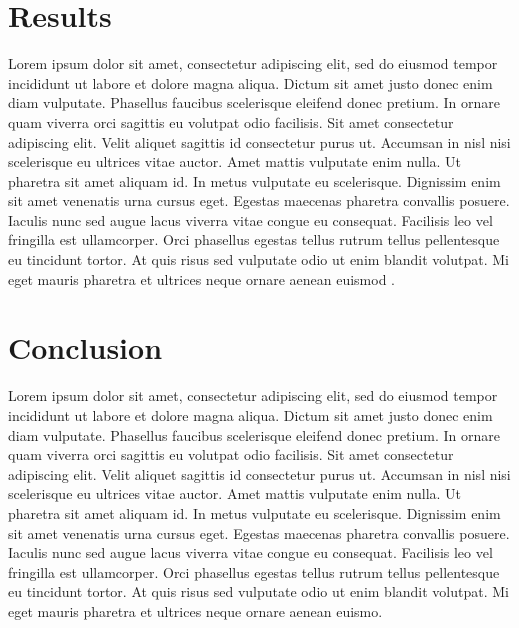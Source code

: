 \documentclass[letterpaper,10pt]{article}
\begin{document}
\section{Results}
Lorem ipsum dolor sit amet, consectetur adipiscing elit, sed do eiusmod tempor incididunt ut labore et dolore magna aliqua. Dictum sit amet justo donec enim diam vulputate. Phasellus faucibus scelerisque eleifend donec pretium. In ornare quam viverra orci sagittis eu volutpat odio facilisis. Sit amet consectetur adipiscing elit. Velit aliquet sagittis id consectetur purus ut. Accumsan in nisl nisi scelerisque eu ultrices vitae auctor. Amet mattis vulputate enim nulla. Ut pharetra sit amet aliquam id. In metus vulputate eu scelerisque. Dignissim enim sit amet venenatis urna cursus eget. Egestas maecenas pharetra convallis posuere. Iaculis nunc sed augue lacus viverra vitae congue eu consequat. Facilisis leo vel fringilla est ullamcorper. Orci phasellus egestas tellus rutrum tellus pellentesque eu tincidunt tortor. At quis risus sed vulputate odio ut enim blandit volutpat. Mi eget mauris pharetra et ultrices neque ornare aenean euismod \cite{Han2022}.


\section{Conclusion}
Lorem ipsum dolor sit amet, consectetur adipiscing elit, sed do eiusmod tempor incididunt ut labore et dolore magna aliqua. Dictum sit amet justo donec enim diam vulputate. Phasellus faucibus scelerisque eleifend donec pretium. In ornare quam viverra orci sagittis eu volutpat odio facilisis. Sit amet consectetur adipiscing elit. Velit aliquet sagittis id consectetur purus ut. Accumsan in nisl nisi scelerisque eu ultrices vitae auctor. Amet mattis vulputate enim nulla. Ut pharetra sit amet aliquam id. In metus vulputate eu scelerisque. Dignissim enim sit amet venenatis urna cursus eget. Egestas maecenas pharetra convallis posuere. Iaculis nunc sed augue lacus viverra vitae congue eu consequat. Facilisis leo vel fringilla est ullamcorper. Orci phasellus egestas tellus rutrum tellus pellentesque eu tincidunt tortor. At quis risus sed vulputate odio ut enim blandit volutpat. Mi eget mauris pharetra et ultrices neque ornare aenean euismo.






\end{document}
